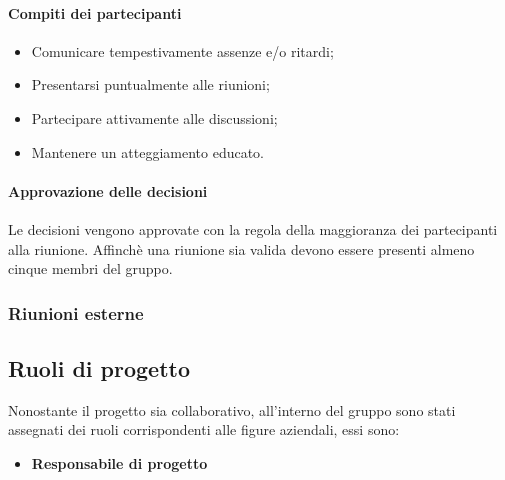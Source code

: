                      \paragraph{Compiti dei partecipanti}
                        \begin{itemize}
                            \item Comunicare tempestivamente assenze e/o ritardi; 
                            \item Presentarsi puntualmente alle riunioni;
                            \item Partecipare attivamente alle discussioni;
                            \item Mantenere un atteggiamento educato.
                        \end{itemize}
                    \paragraph{Approvazione delle decisioni}
                        Le decisioni vengono approvate con la regola della maggioranza dei partecipanti alla riunione.
                        Affinchè una riunione sia valida devono essere presenti almeno cinque membri del gruppo.
                        
                  \subsubsection{Riunioni esterne}
                  
            \subsection{Ruoli di progetto}
                Nonostante il progetto sia collaborativo, all'interno del gruppo sono stati assegnati dei ruoli corrispondenti alle figure aziendali, essi sono:
                \begin{itemize}
                    \item \textbf{Responsabile di progetto}
                \end{itemize}
                       
                     
                
            
    
     
            
            